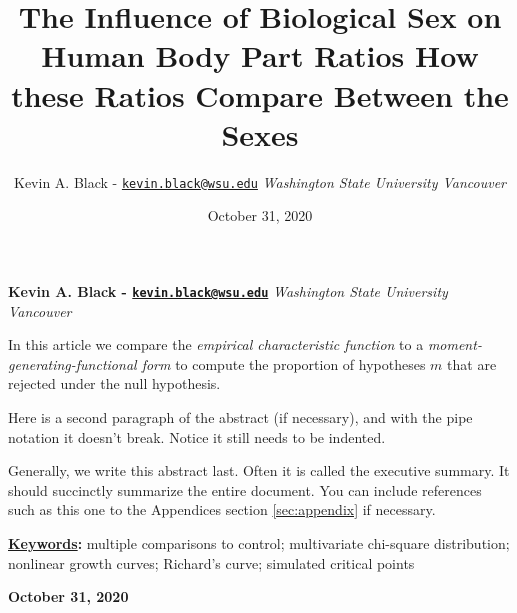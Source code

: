 \documentclass[]{article}
\title{\textbf{\textcolor{WSU.crimson}{The Influence of Biological Sex on Human Body Part Ratios}} \newline \textbf{\textcolor{WSU.gray}{How these Ratios Compare Between the Sexes}}  }
\author{\Large Kevin A. Black -
\href{mailto:kevin.black@wsu.edu}{\nolinkurl{kevin.black@wsu.edu}}\vspace{0.05in} \newline\normalsize\emph{Washington State University Vancouver}  }
\date{October 31, 2020}
\newcommand*{\authorfont}{\fontfamily{phv}\selectfont}
\renewenvironment{abstract}
 {{%
    \setlength{\leftmargin}{0mm}
    \setlength{\rightmargin}{\leftmargin}%
  }%
  \relax}
 {\endlist}
\begin{document}
	
%

{%
\setlength{\parindent}{0pt}
\thispagestyle{plain}
{\fontsize{18}{20}\selectfont\raggedright 
\maketitle  %

}

{
   \vskip 13.5pt\relax \normalsize\fontsize{11}{12} 
   
\textbf{\authorfont Kevin A. Black -
\href{mailto:kevin.black@wsu.edu}{\nolinkurl{kevin.black@wsu.edu}}} \hskip 15pt \emph{\small Washington State University Vancouver}   

}

}








\begin{abstract}

    \hbox{\vrule height .2pt width 39.14pc}

    \vskip 8.5pt %

\noindent In this article we compare the \emph{empirical characteristic function}
\citep{Tukey:1977, Becker:1988} to a
\emph{moment-generating-functional form} to compute the proportion of
hypotheses \(m\) that are rejected under the null hypothesis.
\vspace{0.25in}

\noindent Here is a second paragraph of the abstract (if necessary), and
with the pipe notation it doesn't break. Notice it still needs to be
indented. \vspace{0.25in}

\noindent Generally, we write this abstract last. Often it is called the
executive summary. It should succinctly summarize the entire document.
You can include references such as this one to the Appendices section
\ref{sec:appendix} if necessary.


\vskip 8.5pt \noindent \textbf{\underline{Keywords}:} multiple comparisons to control; multivariate chi-square distribution;
nonlinear growth curves; Richard's curve; simulated critical points \par

    




    
    \hbox{\vrule height .2pt width 39.14pc}
    \vskip 5pt 
    \hfill \textbf{\textcolor{WSU.gray}{ October 31, 2020 } }
    \vskip 5pt 
    
\end{abstract}
\end{document}
